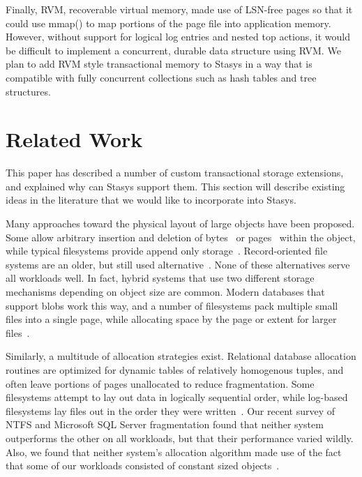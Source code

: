 \documentclass[letterpaper,twocolumn,10pt]{article}
\newcommand{\yad}{Stasys\xspace}
\begin{document}
Finally, RVM, recoverable virtual memory, made use of LSN-free pages
so that it could use mmap() to map portions of the page file into
application memory.\cite{rvm}  However, without support for logical log entries
and nested top actions, it would be difficult to implement a
concurrent, durable data structure using RVM.  We plan to add RVM
style transactional memory to \yad in a way that is compatible with
fully concurrent collections such as hash tables and tree structures.


\section{Related Work}

This paper has described a number of custom transactional storage
extensions, and explained why can \yad support them.  This section
will describe existing ideas in the literature that we would like to
incorporate into \yad.

Many approaches toward the physical layout of large objects have been
proposed.  Some allow arbitrary insertion and deletion of
bytes~\cite{esm} or pages~\cite{sqlserver} within the object, while
typical filesystems provide append only storage~\cite{ffs,ntfs}.
Record-oriented file systems are an older, but still used
alternative~\cite{multics,gfs}. None of these alternatives serve all
workloads well.  In fact, hybrid systems that use two different
storage mechanisms depending on object size are common.  Modern
databases that support blobs work this way, and a number of
filesystems pack multiple small files into a single page, while
allocating space by the page or extent for larger files~\cite{reiserfs3,didFFSdoThis}.

Similarly, a multitude of allocation strategies exist.  Relational
database allocation routines are optimized for dynamic tables of
relatively homogenous tuples, and often leave portions of pages
unallocated to reduce fragmentation.  Some filesystems attempt to lay
out data in logically sequential order, while log-based filesystems
lay files out in the order they were written~\cite{lfs}.  Our recent
survey of NTFS and Microsoft SQL Server fragmentation found that
neither system outperforms the other on all workloads, but that their
performance varied wildly.  Also, we found that neither system's
allocation algorithm made use of the fact that some of our workloads
consisted of constant sized objects~\cite{msrTechReport}.  
\end{document}
